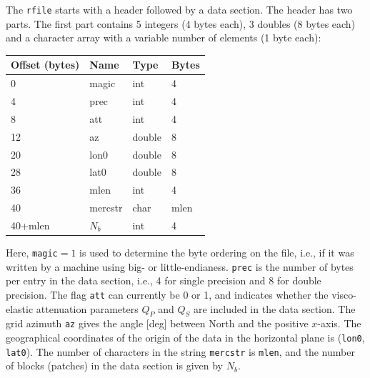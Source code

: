 \documentclass[11pt]{report}
\begin{document}
{The {\tt rfile} starts with a header followed by a data section. The header has two parts. The first
part contains 5 integers (4 bytes each), 3 doubles (8 bytes each) and a character array with a
variable number of elements (1 byte each):
\begin{center}
	\begin{tabular}{llll}\hline
		Offset (bytes) & Name    & Type   & Bytes \\ \hline
		0              & magic   & int    & 4     \\ \hline
		4              & prec    & int    & 4     \\ \hline
		8              & att     & int    & 4     \\ \hline
		12             & az      & double & 8     \\ \hline
		20             & lon0    & double & 8     \\ \hline
		28             & lat0    & double & 8     \\ \hline
		36             & mlen    & int    & 4     \\ \hline
		40             & mercstr & char   & mlen  \\ \hline
		40+mlen        & $N_b$   & int    & 4     \\ \hline
	\end{tabular}
\end{center}
Here, {\tt magic}$=1$ is used to determine the byte ordering on the file, i.e., if it was written by
a machine using big- or little-endianess. {\tt prec} is the number of bytes per entry in the data
section, i.e., 4 for single precision and 8 for double precision. The flag {\tt att} can currently
be 0 or 1, and indicates whether the visco-elastic attenuation parameters $Q_P$ and $Q_S$ are
included in the data section. The grid azimuth {\tt az} gives the angle [deg] between North and the
positive $x$-axis. The geographical coordinates of the origin of the data in the horizontal plane is
({\tt lon0}, {\tt lat0}). The number of characters in the string {\tt mercstr} is {\tt mlen}, and
the number of blocks (patches) in the data section is given by $N_b$.

}
\end{document}

